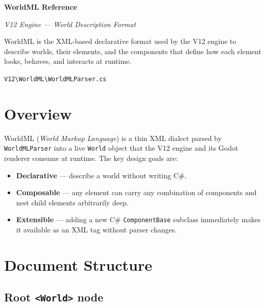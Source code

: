 \documentclass[11pt,a4paper]{article}
\begin{document}
\begin{titlepage}
  \centering
  \vspace*{3cm}
  {\Huge\bfseries WorldML Reference\par}
  \vspace{0.5cm}
  {\large\itshape V12 Engine --- World Description Format\par}
  \vspace{2cm}
  {\normalsize
    WorldML is the XML-based declarative format used by the V12 engine to
    describe worlds, their elements, and the components that define how each
    element looks, behaves, and interacts at runtime.
  \par}
  \vfill
  {\small\texttt{V12\textbackslash WorldML\textbackslash WorldMLParser.cs}\par}
\end{titlepage}

\tableofcontents
\newpage

\section{Overview}

WorldML (\textit{World Markup Language}) is a thin XML dialect parsed by
\texttt{WorldMLParser} into a live \texttt{World} object that the V12 engine
and its Godot renderer consume at runtime.  The key design goals are:

\begin{itemize}[nosep]
  \item \textbf{Declarative} --- describe a world without writing C\#.
  \item \textbf{Composable} --- any element can carry any combination of
        components and nest child elements arbitrarily deep.
  \item \textbf{Extensible} --- adding a new C\# \texttt{ComponentBase}
        subclass immediately makes it available as an XML tag without parser
        changes.
\end{itemize}

\section{Document Structure}

\subsection{Root \texttt{<World>} node}
\end{document}
